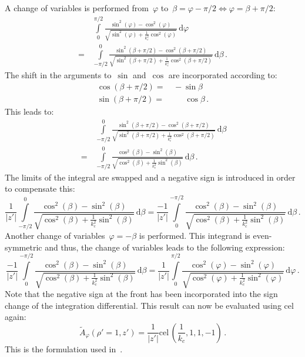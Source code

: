A change of variables is performed from~$\varphi$ to~$\beta = \varphi - \pi/2 \Leftrightarrow \varphi = \beta + \pi/2$:
\begin{align}
 ~&\,  \int\limits_0^{\pi/2} \frac{\sin^2(\varphi) - \cos^2(\varphi)}{\sqrt{\sin^2(\varphi) + \frac{1}{k_c^2} \cos^2(\varphi)}} \,\mathrm{d}\varphi \nonumber \\
 =&\, \int\limits_{-\pi/2}^{0} \frac{\sin^2(\beta + \pi/2) - \cos^2(\beta + \pi/2)}{\sqrt{\sin^2(\beta + \pi/2) + \frac{1}{k_c^2} \cos^2(\beta + \pi/2)}} \,\mathrm{d}\beta \, .
\end{align}
The shift in the arguments to~$\sin$ and~$\cos$ are incorporated according to:
\begin{align}
  \cos(\beta + \pi/2) =&\,          -    \sin{\beta} \\
  \sin(\beta + \pi/2) =&\, \phantom{-}\, \cos{\beta} \, .
\end{align}
This leads to:
\begin{align}
 ~  &\, \int\limits_{-\pi/2}^{0} \frac{\sin^2(\beta + \pi/2) - \cos^2(\beta + \pi/2)}{\sqrt{\sin^2(\beta + \pi/2) + \frac{1}{k_c^2} \cos^2(\beta + \pi/2)}} \,\mathrm{d}\beta \nonumber \\
 ~ =&\, \int\limits_{-\pi/2}^{0} \frac{\cos^2(\beta) - \sin^2(\beta)}{\sqrt{\cos^2(\beta ) + \frac{1}{k_c^2} \sin^2(\beta)}} \,\mathrm{d}\beta \, .
\end{align}
The limits of the integral are swapped and a negative sign is introduced in order to compensate this:
\begin{equation}
   \frac{1}{|z'|} \int\limits_{-\pi/2}^{0} \frac{\cos^2(\beta) - \sin^2(\beta)}{\sqrt{\cos^2(\beta ) + \frac{1}{k_c^2} \sin^2(\beta)}} \,\mathrm{d}\beta
 = \frac{-1}{|z'|} \int\limits_{0}^{-\pi/2} \frac{\cos^2(\beta) - \sin^2(\beta)}{\sqrt{\cos^2(\beta ) + \frac{1}{k_c^2} \sin^2(\beta)}} \,\mathrm{d}\beta \, .
\end{equation}
Another change of variables~$\varphi = -\beta$ is performed.
This integrand is even-symmetric and thus, the change of variables leads to
the following expression:
\begin{equation}
   \frac{-1}{|z'|} \int\limits_{0}^{-\pi/2} \frac{\cos^2(\beta) - \sin^2(\beta)}{\sqrt{\cos^2(\beta ) + \frac{1}{k_c^2} \sin^2(\beta)}} \,\mathrm{d}\beta
 = \frac{1}{|z'|} \int\limits_{0}^{\pi/2} \frac{\cos^2(\varphi) - \sin^2(\varphi)}{\sqrt{\cos^2(\varphi) + \frac{1}{k_c^2} \sin^2(\varphi)}} \,\mathrm{d}\varphi \, .
\end{equation}
Note that the negative sign at the front has been incorporated into the sign change of the integration differential.
This result can now be evaluated using cel again:
\begin{equation}
  \tilde{A}_\varphi(\rho'=1,z') = \frac{1}{|z'|} \textrm{cel}\,\left(\frac{1}{k_c}, 1, 1, -1\right) \, .
\end{equation}
This is the formulation used in~.

